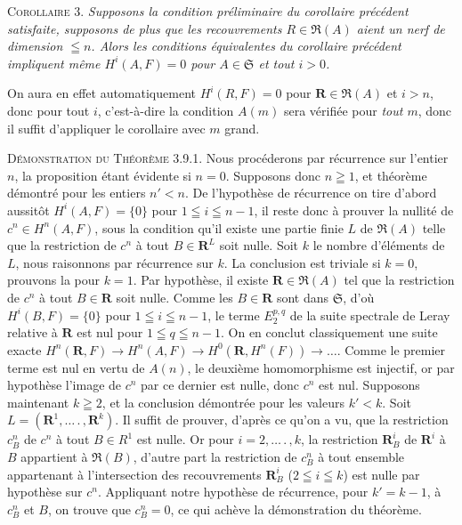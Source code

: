 
\textsc{Corollaire 3.} \textit{Supposons la condition préliminaire du
corollaire précédent satisfaite, supposons de plus que les recouvrements
$R\in\mathfrak R(A)$ aient un nerf de dimension $\leqq n$. Alors les
conditions équivalentes du corollaire précédent impliquent même
$H^i(A,F)=0$ pour $A\in\mathfrak S$ et tout $i>0$.}

On aura en effet automatiquement $H^i(R,F)=0$ pour
$\mathbf R\in\mathfrak R(A)$ et $i>n$, donc pour tout $i$, c'est-à-dire la
condition $A(m)$ sera vérifiée pour \emph{tout $m$}, donc il suffit d'appliquer le
corollaire avec $m$ grand.

\textsc{Démonstration du Théorème 3.9.1.} Nous procéderons par
récurrence sur l'entier $n$, la proposition étant évidente si $n=0$.
Supposons donc $n\geqq1$, et théorème démontré pour les entiers $n'<n$. De
l'hypothèse de récurrence on tire d'abord aussitôt $H^i(A,F)=\{0\}$ pour
$1\leqq i\leqq n-1$, il reste donc à prouver la nullité de
$c^n\in H^n(A,F)$, sous la condition qu'il existe une partie finie $L$ de
$\mathfrak R(A)$ telle que la restriction de $c^n$ à tout
$B\in\mathbf R^L$ soit nulle. Soit $k$ le nombre d'éléments de $L$, nous
raisonnons par récurrence sur $k$. La conclusion est triviale si $k=0$,
prouvons la pour $k=1$.
Par hypothèse, il existe $\mathbf R\in\mathfrak R(A)$ tel que la restriction
de $c^n$ à tout $B\in\mathbf R$ soit nulle. Comme les $B\in\mathbf R$ sont
dans $\mathfrak S$, d'où $H^i(B,F)=\{0\}$ pour $1\leqq i\leqq n-1$, le terme
$E_2^{p,q}$ de la suite spectrale de Leray relative à $\mathbf R$ est nul pour
$1\leqq q\leqq n-1$. On en conclut classiquement une suite exacte
$H^n(\mathbf R,F)\to H^n(A,F)
\to H^0(\mathbf R,H^n(F))\to\ldots$.
Comme le premier terme est nul en vertu de $A(n)$, le deuxième homomorphisme
est injectif, or par hypothèse l'image de $c^n$ par ce dernier est nulle, donc
$c^n$ est nul.
Supposons maintenant $k\geqq2$, et la conclusion démontrée pour les valeurs
$k'<k$. Soit $L=(\mathbf R^1,\ldots\mathpunct{.},\mathbf R^k)$. Il suffit de prouver,
d'après ce qu'on a vu, que la restriction $c_B^n$ de $c^n$ à tout
$B\in R^1$ est nulle. Or pour $i=2,\ldots\mathpunct{.},k$, la restriction
$\mathbf R_B^i$ de $\mathbf R^i$ à $B$ appartient à $\mathfrak R(B)$,
d'autre part la restriction de $c_B^n$ à tout ensemble appartenant à
l'intersection des recouvrements $\mathbf R_B^i$ ($2\leqq i\leqq k$) est nulle
par hypothèse sur $c^n$. Appliquant notre hypothèse de récurrence, pour
$k'=k-1$, à $c_B^n$ et $B$, on trouve que $c_B^n=0$, ce qui achève la
démonstration du théorème.

